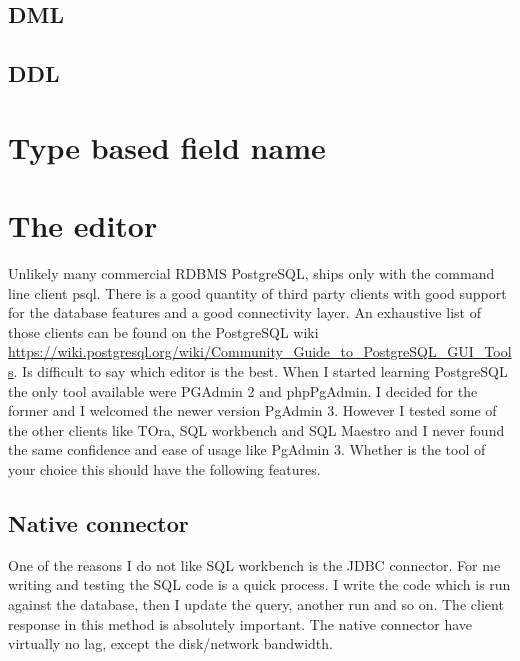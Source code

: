 \subsection{DML}

\subsection{DDL}

\section{Type based field name}


\section{The editor}
Unlikely many commercial RDBMS PostgreSQL, ships only with the command line client psql. There is a 
good quantity of third party clients with good support for the database features and a good connectivity 
layer. An exhaustive list of those clients can be found on the PostgreSQL wiki\newline
\href{https://wiki.postgresql.org/wiki/Community\_Guide\_to\_PostgreSQL\_GUI\_Tools}{
https://wiki.postgresql.org/wiki/Community\_Guide\_to\_PostgreSQL\_GUI\_Tools}. Is difficult to say 
which editor is the best. When I started learning PostgreSQL the only tool available were PGAdmin 2 and 
phpPgAdmin. I decided for the former and I welcomed the newer version PgAdmin 3. However I tested some of 
the other clients like TOra, SQL workbench and SQL Maestro and I never found the same confidence and ease 
of usage like PgAdmin 3. Whether is the tool of your choice this should have the following features.

\subsection{Native connector}
One of the reasons I do not like SQL workbench is the JDBC connector. For me writing and testing the SQL 
code is a quick process. I write the code which is run against the database, then I update the query, 
another run and so on. The client response in this method is absolutely important. The native connector 
have virtually no lag, except the disk/network bandwidth.




